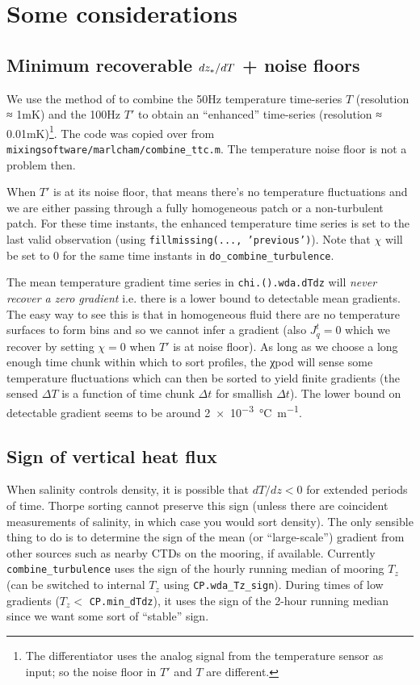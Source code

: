 \section{Some considerations}

\subsection{Minimum recoverable $dz_{*}/dT$ + noise floors}

We use the method of \cite{Mudge1994} to combine the 50Hz temperature time-series $T$ (resolution ≈ 1mK) and the 100Hz $T'$ to obtain an ``enhanced'' time-series (resolution ≈ 0.01mK)\footnote{The differentiator uses the analog signal from the temperature sensor as input; so the noise floor in $T'$ and $T$ are different.}.
The code was copied over from \texttt{mixingsoftware/marlcham/combine\_ttc.m}.
The temperature noise floor is not a problem then.

When $T'$ is at its noise floor, that means there's no temperature fluctuations and we are either passing through a fully homogeneous patch or a non-turbulent patch.
For these time instants, the enhanced temperature time series is set to the last valid observation (using \texttt{fillmissing(..., 'previous')}).
Note that $χ$ will be set to 0 for the same time instants in \texttt{do\_combine\_turbulence}.

The mean temperature gradient time series in \texttt{chi.().wda.dTdz} will \emph{never recover a zero gradient} i.e. there is a lower bound to detectable mean gradients.
The easy way to see this is that in homogeneous fluid there are no temperature surfaces to form bins and so we cannot infer a gradient (also $J_q^t = 0$ which we recover by setting $χ=0$ when $T'$ is at noise floor).
As long as we choose a long enough time chunk within which to sort profiles, the χpod will sense some temperature fluctuations which can then be sorted to yield finite gradients (the sensed $ΔT$ is a function of time chunk $Δt$ for smallish $Δt$).
The lower bound on detectable gradient seems to be around \SI{2e-3}{\celsius\per\metre}.

\subsection{Sign of vertical heat flux}
When salinity controls density, it is possible that $dT/dz < 0$ for extended periods of time.
Thorpe sorting cannot preserve this sign (unless there are coincident measurements of salinity, in which case you would sort density).
The only sensible thing to do is to determine the sign of the mean (or ``large-scale'') gradient from other sources such as nearby CTDs on the mooring, if available.
Currently \texttt{combine\_turbulence} uses the sign of the hourly running median of mooring $T_z$ (can be switched to internal $T_z$ using \texttt{CP.wda\_Tz\_sign}).
During times of low gradients ($T_z < $ \texttt{CP.min\_dTdz}), it uses the sign of the 2-hour running median since we want some sort of ``stable'' sign.


